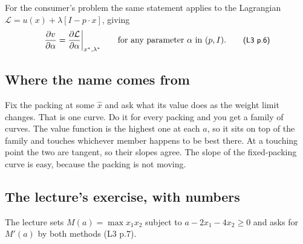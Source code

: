 \documentclass[11pt,letterpaper]{article}
\theoremstyle{definition}
\theoremstyle{plain}
\newcommand{\src}[1]{{\small\textsf{(#1)}}}
\begin{document}
For the consumer's problem the same statement applies to the Lagrangian
$\mathcal{L} = u(x) + \lambda[I - p \cdot x]$, giving
\[
\frac{\partial v}{\partial \alpha} = \frac{\partial \mathcal{L}}{\partial \alpha}
\bigg|_{x^*, \lambda^*} \qquad \text{for any parameter } \alpha \text{ in } (p,I).
\qquad \src{L3 p.6}
\]

\subsection{Where the name comes from}

Fix the packing at some $\hat x$ and ask what its value does as the weight limit changes. That is one
curve. Do it for every packing and you get a family of curves. The value function is the highest one
at each $a$, so it sits on top of the family and touches whichever member happens to be best there.
At a touching point the two are tangent, so their slopes agree. The slope of the fixed-packing curve
is easy, because the packing is not moving.

\begin{center}
\end{center}

\subsection{The lecture's exercise, with numbers}

The lecture sets $M(a) = \max x_1 x_2$ subject to $a - 2x_1 - 4x_2 \ge 0$ and asks for $M'(a)$ by
both methods \src{L3 p.7}.
\end{document}
